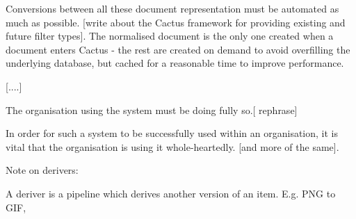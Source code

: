 Conversions between all these document representation must be
automated as much as possible.  [write about the Cactus framework for
providing existing and future filter types].  The normalised document
is the only one created when a document enters Cactus - the rest are
created on demand to avoid overfilling the underlying database, but
cached for a reasonable time to improve performance.

[....]


The organisation using the system must be doing fully so.[ rephrase]

In order for such a system to be successfully used within an
organisation, it is vital that the organisation is using it
whole-heartedly.  [and more of the same].


Note on derivers:

A deriver is a pipeline which derives another version of an item.
E.g. PNG to GIF,

